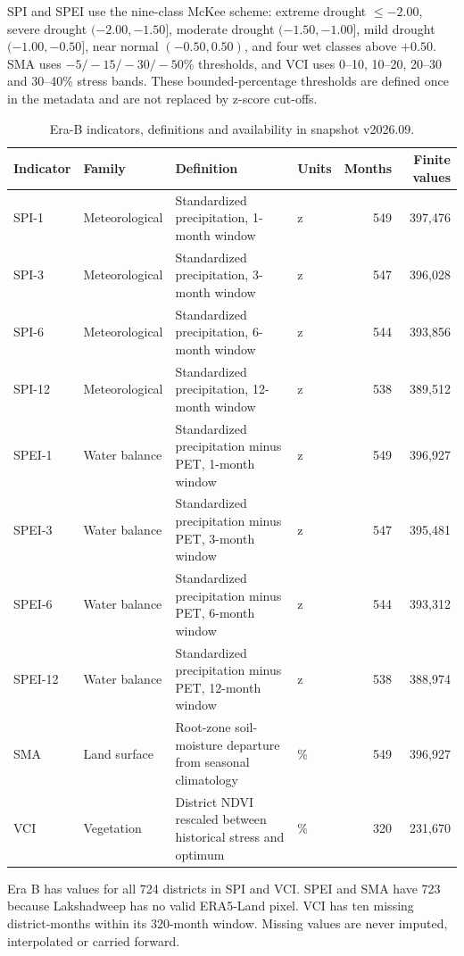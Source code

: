 \documentclass[11pt,a4paper]{article}
\begin{document}
SPI and SPEI use the nine-class McKee scheme: extreme drought $\le-2.00$, severe drought $(-2.00,-1.50]$, moderate drought $(-1.50,-1.00]$, mild drought $(-1.00,-0.50]$, near normal $(-0.50,0.50)$, and four wet classes above $+0.50$. SMA uses $-5/-15/-30/-50$\% thresholds, and VCI uses 0--10, 10--20, 20--30 and 30--40\% stress bands. These bounded-percentage thresholds are defined once in the metadata and are not replaced by z-score cut-offs.

\begin{table}[t]
\caption{Era-B indicators, definitions and availability in snapshot v2026.09.}
\small
\begin{tabularx}{\textwidth}{@{}>{\RaggedRight\arraybackslash}l>{\RaggedRight\arraybackslash}l>{\RaggedRight\arraybackslash}X>{\RaggedRight\arraybackslash}lrr@{}}
\toprule
Indicator & Family & Definition & Units & Months & Finite values \\
\midrule
SPI-1 & Meteorological & Standardized precipitation, 1-month window & z & 549 & 397,476 \\
SPI-3 & Meteorological & Standardized precipitation, 3-month window & z & 547 & 396,028 \\
SPI-6 & Meteorological & Standardized precipitation, 6-month window & z & 544 & 393,856 \\
SPI-12 & Meteorological & Standardized precipitation, 12-month window & z & 538 & 389,512 \\
SPEI-1 & Water balance & Standardized precipitation minus PET, 1-month window & z & 549 & 396,927 \\
SPEI-3 & Water balance & Standardized precipitation minus PET, 3-month window & z & 547 & 395,481 \\
SPEI-6 & Water balance & Standardized precipitation minus PET, 6-month window & z & 544 & 393,312 \\
SPEI-12 & Water balance & Standardized precipitation minus PET, 12-month window & z & 538 & 388,974 \\
SMA & Land surface & Root-zone soil-moisture departure from seasonal climatology & \% & 549 & 396,927 \\
VCI & Vegetation & District NDVI rescaled between historical stress and optimum & \% & 320 & 231,670 \\
\bottomrule
\end{tabularx}
\end{table}

Era B has values for all 724 districts in SPI and VCI. SPEI and SMA have 723 because Lakshadweep has no valid ERA5-Land pixel. VCI has ten missing district-months within its 320-month window. Missing values are never imputed, interpolated or carried forward.
\end{document}
